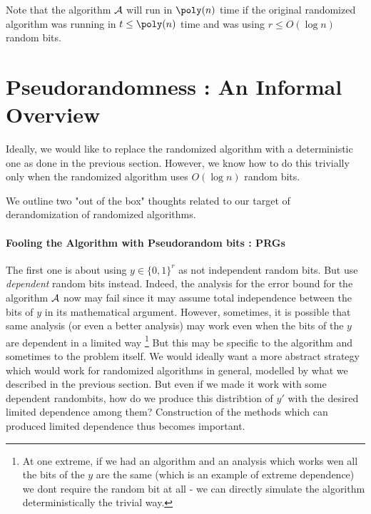 \begin{remark}
Note that the algorithm ${\cal{A}}$ will run in $\poly(n)$ time if the original randomized algorithm was running in $t \le \poly(n)$ time and was using $r \le O(\log n)$ random bits.
\end{remark}

%
%

\section{Pseudorandomness : An Informal Overview}

Ideally, we would like to replace the randomized algorithm with a deterministic one as done in the previous section. However, we know how to do this trivially only when the randomized algorithm uses $O(\log n)$ random bits.

We outline two "out of the box" thoughts related to our target of derandomization of randomized algorithms.

\paragraph{Fooling the Algorithm with Pseudorandom bits : PRGs}

The first one is about using $y \in \{0,1\}^r$ as not independent random bits. But use {\em dependent} random bits instead. Indeed, the analysis for the error bound for the algorithm ${\cal{A}}$ now may fail since it may assume total independence between the bits of $y$ in its mathematical argument. However, sometimes, it is possible that same analysis (or even a better analysis) may work even when the bits of the $y$ are dependent in a limited way \footnote{At one extreme, if we had an algorithm and an analysis which works wen all the bits of the $y$ are the same (which is an example of extreme dependence) we dont require the random bit at all - we can directly simulate the algorithm deterministically the trivial way.} But this may be specific to the algorithm and sometimes to the problem itself. We would ideally want a more abstract strategy which would work for randomized algorithms in general, modelled by what we described in the previous section. But even if we made it work with some dependent randombits, how do we produce this distribtion of $y'$ with the desired limited dependence among them? Construction of the methods which can produced limited dependence thus becomes important.

